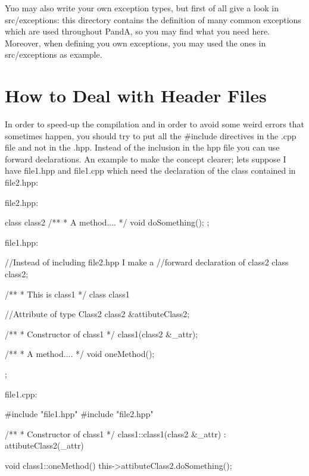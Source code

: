 Yuo may also write your own exception types, but first of all give a look in src/exceptions\+: this directory contains the definition of many common exceptions which are used throughout PandA, so you may find what you need here. Moreover, when defining you own exceptions, you may used the ones in src/exceptions as example.\hypertarget{programming_style_header_including}{}\section{How to Deal with Header Files}\label{programming_style_header_including}
In order to speed-\/up the compilation and in order to avoid some weird errors that sometimes happen, you should try to put all the {\ttfamily \#include} directives in the .cpp file and not in the .hpp. Instead of the inclusion in the hpp file you can use forward declarations. An example to make the concept clearer; lets suppose I have file1.\+hpp and file1.\+cpp which need the declaration of the class contained in file2.\+hpp\+: \begin{DoxyVerb}file2.hpp:

   class class2
   {
      /**
       * A method....
       */
      void doSomething();
   };

file1.hpp:

   //Instead of including file2.hpp I make a
   //forward declaration of class2
   class class2;

   /**
    * This is class1
    */
   class class1
   {
      //Attribute of type Class2
      class2 &attibuteClass2;

      /**
       * Constructor of class1
       */
      class1(class2 &_attr);

      /**
       * A method....
       */
      void oneMethod();
   };

file1.cpp:

   #include "file1.hpp"
   #include "file2.hpp"

   /**
    * Constructor of class1
    */
   class1::class1(class2 &_attr) : attibuteClass2(_attr){}

   void class1::oneMethod()
   {
      this->attibuteClass2.doSomething();
   }
\end{DoxyVerb}


